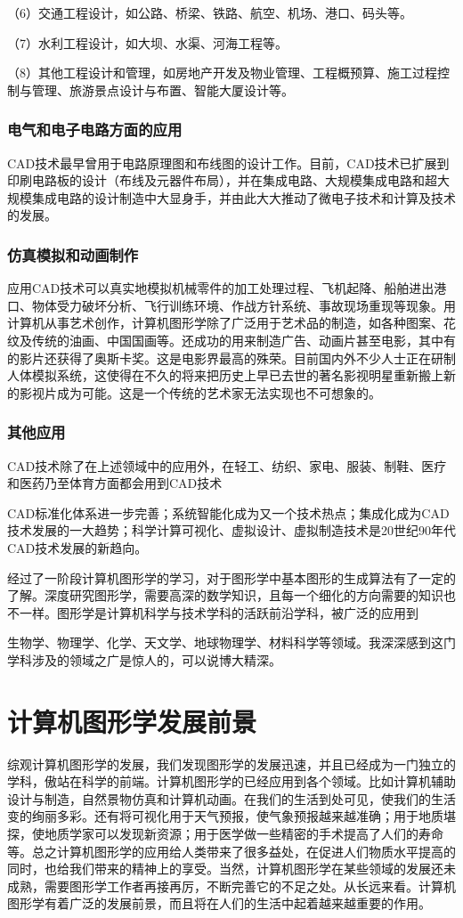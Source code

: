 \documentclass[UTF8]{article}
\begin{document}
（6）交通工程设计，如公路、桥梁、铁路、航空、机场、港口、码头等。

（7）水利工程设计，如大坝、水渠、河海工程等。

（8）其他工程设计和管理，如房地产开发及物业管理、工程概预算、施工过程控制与管理、旅游景点设计与布置、智能大厦设计等。
\subsubsection{电气和电子电路方面的应用}
CAD技术最早曾用于电路原理图和布线图的设计工作。目前，CAD技术已扩展到印刷电路板的设计（布线及元器件布局），并在集成电路、大规模集成电路和超大规模集成电路的设计制造中大显身手，并由此大大推动了微电子技术和计算及技术的发展。
\subsubsection{仿真模拟和动画制作}
应用CAD技术可以真实地模拟机械零件的加工处理过程、飞机起降、船舶进出港口、物体受力破坏分析、飞行训练环境、作战方针系统、事故现场重现等现象。用计算机从事艺术创作，计算机图形学除了广泛用于艺术品的制造，如各种图案、花纹及传统的油画、中国国画等。还成功的用来制造广告、动画片甚至电影，其中有的影片还获得了奥斯卡奖。这是电影界最高的殊荣。目前国内外不少人士正在研制人体模拟系统，这使得在不久的将来把历史上早已去世的著名影视明星重新搬上新的影视片成为可能。这是一个传统的艺术家无法实现也不可想象的。

\subsubsection{其他应用}
CAD技术除了在上述领域中的应用外，在轻工、纺织、家电、服装、制鞋、医疗和医药乃至体育方面都会用到CAD技术

CAD标准化体系进一步完善；系统智能化成为又一个技术热点；集成化成为CAD技术发展的一大趋势；科学计算可视化、虚拟设计、虚拟制造技术是20世纪90年代CAD技术发展的新趋向。

经过了一阶段计算机图形学的学习，对于图形学中基本图形的生成算法有了一定的了解。深度研究图形学，需要高深的数学知识，且每一个细化的方向需要的知识也不一样。图形学是计算机科学与技术学科的活跃前沿学科，被广泛的应用到

生物学、物理学、化学、天文学、地球物理学、材料科学等领域。我深深感到这门学科涉及的领域之广是惊人的，可以说博大精深。

\section{计算机图形学发展前景}

综观计算机图形学的发展，我们发现图形学的发展迅速，并且已经成为一门独立的学科，傲站在科学的前端。计算机图形学的已经应用到各个领域。比如计算机辅助设计与制造，自然景物仿真和计算机动画。在我们的生活到处可见，使我们的生活变的绚丽多彩。还有将可视化用于天气预报，使气象预报越来越准确；用于地质堪探，使地质学家可以发现新资源；用于医学做一些精密的手术提高了人们的寿命等。总之计算机图形学的应用给人类带来了很多益处，在促进人们物质水平提高的同时，也给我们带来的精神上的享受。当然，计算机图形学在某些领域的发展还未成熟，需要图形学工作者再接再厉，不断完善它的不足之处。从长远来看。计算机图形学有着广泛的发展前景，而且将在人们的生活中起着越来越重要的作用。
\end{document}
